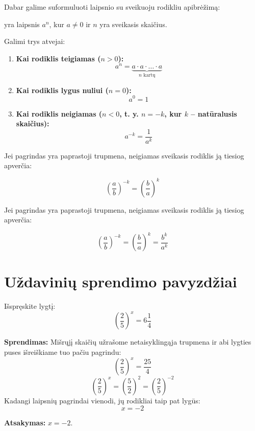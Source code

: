 \documentclass[11pt,a4paper]{scrartcl}
\begin{document}
Dabar galime suformuluoti laipsnio su sveikuoju rodikliu apibrėžimą:
\begin{definition}
    yra laipsnis $a^n$, kur  $a \neq 0$ ir $n$ yra sveikasis skaičius.
\end{definition}
Galimi trys atvejai:
\begin{enumerate}
    \item \textbf{Kai rodiklis teigiamas ($n > 0$):} 
    $$a^n = \underbrace{a \cdot a \cdot \dots \cdot a}_{n \text{ kartų}}$$
    
    \item \textbf{Kai rodiklis lygus nuliui ($n = 0$):} 
    $$a^0 = 1$$
    
    \item \textbf{Kai rodiklis neigiamas ($n < 0$, t. y. $n = -k$, kur $k$ -- natūralusis skaičius):}
    $$a^{-k} = \frac{1}{a^k}$$
\end{enumerate}
\begin{remark}
Jei pagrindas yra paprastoji trupmena, neigiamas sveikasis rodiklis ją tiesiog apverčia:

$$\left(\frac{a}{b}\right)^{-k} = \left(\frac{b}{a}\right)^k $$
\end{remark}

Jei pagrindas yra paprastoji trupmena, neigiamas sveikasis rodiklis ją tiesiog apverčia:

$$\left(\frac{a}{b}\right)^{-k} = \left(\frac{b}{a}\right)^k = \frac{b^k}{a^k}$$

\section{Uždavinių sprendimo pavyzdžiai}

\begin{example}
Išspręskite lygtį:
$$\left(\frac{2}{5}\right)^x = 6\frac{1}{4}$$

\textbf{Sprendimas:} Mišrųjį skaičių užrašome netaisyklingąja trupmena ir abi lygties puses išreiškiame tuo pačiu pagrindu:
$$\left(\frac{2}{5}\right)^x = \frac{25}{4}$$
$$\left(\frac{2}{5}\right)^x = \left(\frac{5}{2}\right)^2 = \left(\frac{2}{5}\right)^{-2}$$
Kadangi laipsnių pagrindai vienodi, jų rodikliai taip pat lygūs:
$$x = -2$$

\textbf{Atsakymas:} $x = -2$.
\end{example}
\end{document}
